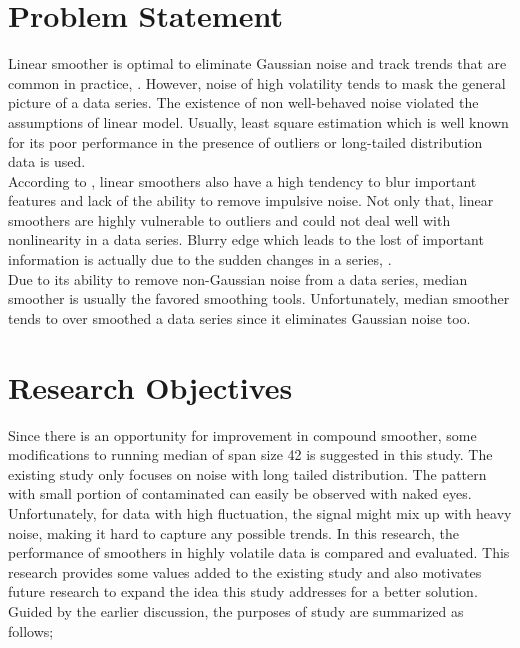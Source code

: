\documentclass[12pt, a4paper]{report}
\begin{document}
\section{Problem Statement}

Linear smoother is optimal to eliminate Gaussian noise and track trends that are common in practice, \cite{bernholt2006}. 
However, noise of high volatility tends to mask the general picture of a data series. The existence of non well-behaved noise violated the assumptions of linear model. Usually, least square estimation which is well known for its poor performance in the presence of outliers or long-tailed distribution data is used. \\

According to \cite{venet1990}, linear smoothers also have a high tendency to blur important features and lack of the ability to remove impulsive noise. Not only that, linear smoothers are highly vulnerable to outliers and could not deal well with nonlinearity in a data series. Blurry edge which leads to the lost of important information is actually due to the sudden changes in a series, \cite{bernholt2006}. \\

Due to its ability to remove non-Gaussian noise from a data series, median smoother is usually the favored smoothing tools. Unfortunately, median smoother tends to over smoothed a data series since it eliminates Gaussian noise too. 

\section{Research Objectives}

Since there is an opportunity for improvement in compound smoother, some modifications to running median of span size 42 is suggested in this study. The existing study only focuses on noise with long tailed distribution. The pattern with small portion of contaminated can easily be observed with naked eyes. Unfortunately, for data with high fluctuation, the signal might mix up with heavy noise, making it hard to capture any possible trends. In this research, the performance of smoothers in highly volatile data is compared and evaluated. This research provides some values added to the existing study and also motivates future research to expand the idea this study addresses for a better solution.
Guided by the earlier discussion, the purposes of study are summarized as follows;
\end{document}
